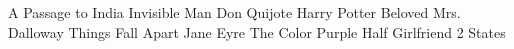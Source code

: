 A Passage to India
Invisible Man
Don Quijote
Harry Potter
Beloved 
Mrs. Dalloway
Things Fall Apart
Jane Eyre
The Color Purple
Half Girlfriend
2 States
